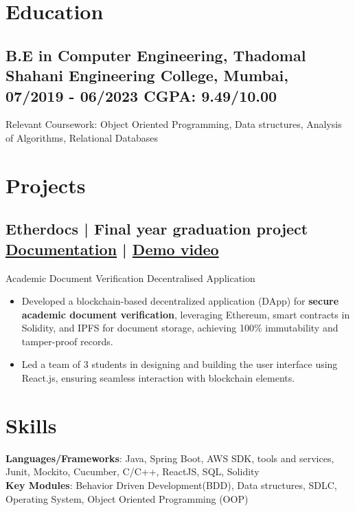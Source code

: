 \documentclass[a4,10pt]{article}
\newcommand{\subtext}[1]{
#1\par\vspace{-0.2cm}}
\newenvironment{zitemize}{
\begin{itemize}\itemsep0pt \parskip0pt \parsep1pt}
{\end{itemize}\vspace{-0.5cm}}
\begin{document}
\section{Education }
\subsection*{B.E in Computer Engineering, {\normalsize \normalfont Thadomal Shahani Engineering College, Mumbai, 07/2019 - 06/2023} \hfill CGPA: 9.49/10.00} 
\subtext{{Relevant Coursework: Object Oriented Programming, Data structures, Analysis of Algorithms, Relational Databases} }


\section{Projects} 

\subsection*{Etherdocs | Final year graduation project \hfill {\href{https://github.com/DevelopersLeague/EtherDocs/blob/main/Readme.md}{Documentation}} | {\href{https://youtu.be/B_44aJ9hh6U?si=dGItpsQ3AEo_eIxk}{Demo video} }
}
\subtext{{\normalsize\normalfont Academic Document Verification Decentralised Application}}
    \begin{zitemize}
        \item Developed a blockchain-based decentralized application (DApp) for \textbf{secure academic document verification}, leveraging Ethereum, smart contracts in Solidity, and IPFS for document storage, achieving 100\% immutability and tamper-proof records.
        \item Led a team of 3 students in designing and building the user interface using React.js, ensuring seamless interaction with blockchain elements.
    \end{zitemize}



\section{Skills}
\textbf{Languages/Frameworks}: Java, Spring Boot, AWS SDK, tools and services, Junit, Mockito, Cucumber, C/C++, ReactJS, SQL, Solidity \\ 
\textbf{Key Modules}: Behavior Driven Development(BDD), Data structures, SDLC, Operating System, Object Oriented Programming (OOP)
\end{document}
